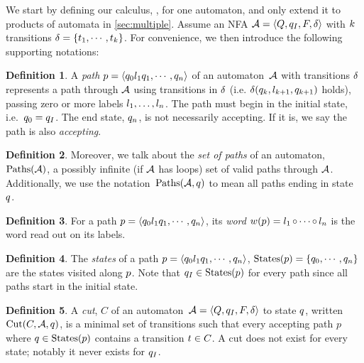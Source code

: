 \documentclass[acmsmall,review,anonymous,screen]{acmart}\settopmatter{printfolios=true,printccs=false,printacmref=true}
\theoremstyle{definition}
\newtheorem{definition}{Definition}[section]
\begin{document}
We start by defining our calculus, \Calculus{}, for one automaton, and only
extend it to products of automata in \cref{sec:multiple}. Assume an NFA
$\mathcal{A} = \left\langle Q, q_I, F, \delta\right\rangle$ with $k$ transitions $\delta =
\left\{t_{1} , \cdots , t_{k}\right\}$. For convenience, we then
introduce the following supporting notations:

\begin{definition}
  A \textit{path} $p = \left\langle q_0 l_1 q_1 , \cdots , q_n\right\rangle$ of an automaton~$\mathcal{A}$ with
  transitions $\delta$ represents a path through $\mathcal{A}$ using
  transitions in $\delta$ (i.e. $\delta(q_k, l_{k+1},
  q_{k+1})$ holds), passing zero or more labels $l_1, \ldots,
  l_n$. The path must begin in the initial state, i.e.~$q_0 =
  q_I$. The end state, $q_n$, is not necessarily accepting. If it
  is, we say the path is also \textit{accepting}.
  \end{definition}

\begin{definition}
  Moreover, we talk about the \textit{set of paths} of an automaton,
  $\operatorname{Paths}(\mathcal{A})$, a possibly infinite (if $\mathcal{A}$ has loops) set of
  valid paths through $\mathcal{A}$. Additionally, we use the
  notation~$\operatorname{Paths}(\mathcal{A}, q)$ to mean all paths ending in
  state~$q$.
\end{definition}

\begin{definition}
  For a path $p = \left\langle q_0 l_1 q_1 , \cdots ,
  q_n\right\rangle$, its \textit{word} $w(p) = l_1 \operatorname{\circ} \cdots \operatorname{\circ}
  l_n$ is the word read out on its labels.
\end{definition}

\begin{definition}
  The \textit{states} of a path $p = \left\langle q_0 l_1 q_1
  , \cdots , q_n\right\rangle$, $\operatorname{States}(p) = \left\{q_0, \cdots ,
  q_n\right\}$ are the states visited along $p$. Note that $q_I \in
  \operatorname{States}(p)$ for every path since all paths start in the initial state.
\end{definition}

\begin{definition}
  A \textit{cut}, $C$ of an automaton~$\mathcal{A} = \left\langle Q, q_I, F, \delta\right\rangle$ to state
  $q$, written $\operatorname{Cut}(C, \mathcal{A}, q)$, is a minimal set of
  transitions such that every accepting path $p$ where $q \in
  \operatorname{States}(p)$ contains a transition $t \in C$. A cut does not
  exist for every state; notably it never exists for $q_I$.
\end{definition}
\end{document}
